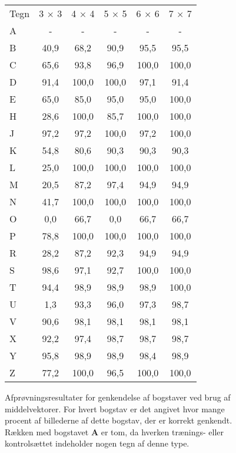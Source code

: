 \begin{figure}[htp]
\centering
\begin{tabular}{|l|c|c|c|c|c|}\hline
\rowcolor[gray]{0.9} \multicolumn{6}{|>{\columncolor[gray]{0.9}}c|}{\textbf{Middelvektor}} \\ \hline
Tegn & 3 $\times$ 3 & 4 $\times$ 4 & 5 $\times$ 5 & 6 $\times$ 6 & 7 $\times$ 7\\\hline
A & - & - & - & - & -\\\hline
B & 40,9 & 68,2 & 90,9 & 95,5 & 95,5\\\hline
C & 65,6 & 93,8 & 96,9 & 100,0 & 100,0\\\hline
D & 91,4 & 100,0 & 100,0 & 97,1 & 91,4\\\hline
E & 65,0 & 85,0 & 95,0 & 95,0 & 100,0\\\hline
H & 28,6 & 100,0 & 85,7 & 100,0 & 100,0\\\hline
J & 97,2 & 97,2 & 100,0 & 97,2 & 100,0\\\hline
K & 54,8 & 80,6 & 90,3 & 90,3 & 90,3\\\hline
L & 25,0 & 100,0 & 100,0 & 100,0 & 100,0\\\hline
M & 20,5 & 87,2 & 97,4 & 94,9 & 94,9\\\hline
N & 41,7 & 100,0 & 100,0 & 100,0 & 100,0\\\hline
O & 0,0 & 66,7 & 0,0    & 66,7 & 66,7\\\hline
P & 78,8 & 100,0 & 100,0 & 100,0 & 100,0\\\hline
R & 28,2 & 87,2 & 92,3 & 94,9 & 94,9\\\hline
S & 98,6 & 97,1 & 92,7 & 100,0 & 100,0\\\hline
T & 94,4 & 98,9 & 98,9 & 98,9 & 100,0\\\hline
U & 1,3 & 93,3 & 96,0 & 97,3 & 98,7\\\hline
V & 90,6 & 98,1 & 98,1 & 98,1 & 98,1\\\hline
X & 92,2 & 97,4 & 98,7 & 98,7 & 98,7\\\hline
Y & 95,8 & 98,9 & 98,9 & 98,4 & 98,9\\\hline
Z & 77,2 & 100,0 & 96,5 & 100,0 & 100,0\\\hline
\end{tabular}
\caption{Afprøvningsresultater for genkendelse af bogstaver ved brug af middelvektorer. For hvert bogstav er det angivet hvor mange procent af billederne af dette bogstav, der er korrekt genkendt. Rækken med bogstavet \textbf{A} er tom, da hverken trænings- eller kontrolsættet indeholder nogen tegn af denne type.}
\label{fig:test:middel_bogstav}
\end{figure}

